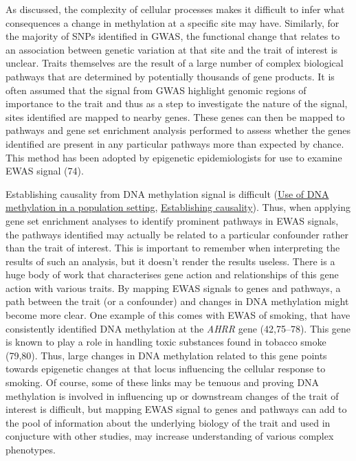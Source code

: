 \documentclass[11pt,twoside]{bristolthesis}
\begin{document}
As discussed, the complexity of cellular processes makes it difficult to infer what consequences a change in methylation at a specific site may have. Similarly, for the majority of SNPs identified in GWAS, the functional change that relates to an association between genetic variation at that site and the trait of interest is unclear. Traits themselves are the result of a large number of complex biological pathways that are determined by potentially thousands of gene products. It is often assumed that the signal from GWAS highlight genomic regions of importance to the trait and thus as a step to investigate the nature of the signal, sites identified are mapped to nearby genes. These genes can then be mapped to pathways and gene set enrichment analysis performed to assess whether the genes identified are present in any particular pathways more than expected by chance. This method has been adopted by epigenetic epidemiologists for use to examine EWAS signal (74).

Establishing causality from DNA methylation signal is difficult (\protect\hyperlink{dnam-phs}{Use of DNA methylation in a population setting}, \protect\hyperlink{establishing-causality}{Establishing causality}). Thus, when applying gene set enrichment analyses to identify prominent pathways in EWAS signals, the pathways identified may actually be related to a particular confounder rather than the trait of interest. This is important to remember when interpreting the results of such an analysis, but it doesn't render the results useless. There is a huge body of work that characterises gene action and relationships of this gene action with various traits. By mapping EWAS signals to genes and pathways, a path between the trait (or a confounder) and changes in DNA methylation might become more clear. One example of this comes with EWAS of smoking, that have consistently identified DNA methylation at the \emph{AHRR} gene (42,75--78). This gene is known to play a role in handling toxic substances found in tobacco smoke (79,80). Thus, large changes in DNA methylation related to this gene points towards epigenetic changes at that locus influencing the cellular response to smoking. Of course, some of these links may be tenuous and proving DNA methylation is involved in influencing up or downstream changes of the trait of interest is difficult, but mapping EWAS signal to genes and pathways can add to the pool of information about the underlying biology of the trait and used in conjucture with other studies, may increase understanding of various complex phenotypes.
\end{document}
